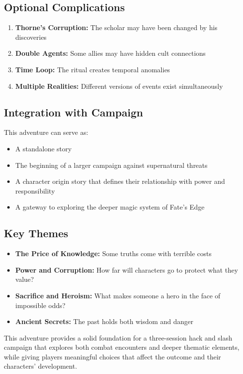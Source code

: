 \documentclass[11pt]{article}
\begin{document}
\subsection*{Optional Complications}
\begin{enumerate}[leftmargin=*]
\item \textbf{Thorne's Corruption:} The scholar may have been changed by his discoveries
\item \textbf{Double Agents:} Some allies may have hidden cult connections
\item \textbf{Time Loop:} The ritual creates temporal anomalies
\item \textbf{Multiple Realities:} Different versions of events exist simultaneously
\end{enumerate}

\subsection*{Integration with Campaign}
This adventure can serve as:
\begin{itemize}[leftmargin=*]
\item A standalone story
\item The beginning of a larger campaign against supernatural threats
\item A character origin story that defines their relationship with power and responsibility
\item A gateway to exploring the deeper magic system of Fate's Edge
\end{itemize}

\subsection*{Key Themes}
\begin{itemize}[leftmargin=*]
\item \textbf{The Price of Knowledge:} Some truths come with terrible costs
\item \textbf{Power and Corruption:} How far will characters go to protect what they value?
\item \textbf{Sacrifice and Heroism:} What makes someone a hero in the face of impossible odds?
\item \textbf{Ancient Secrets:} The past holds both wisdom and danger
\end{itemize}

This adventure provides a solid foundation for a three-session hack and slash campaign that explores both combat encounters and deeper thematic elements, while giving players meaningful choices that affect the outcome and their characters' development.


\end{document}

